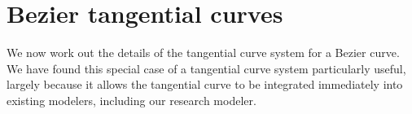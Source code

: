 \documentclass[12pt]{article}
\newcommand{\atang}{tangential a-curve\ }
\begin{document}


\section{Bezier tangential curves}
\label{sec:bez}

We now work out the details of the tangential curve system for a Bezier curve.
We have found this special case of a tangential curve system particularly useful,
largely because it allows the tangential curve to be integrated immediately
into existing modelers, including our research modeler.
\end{document}
